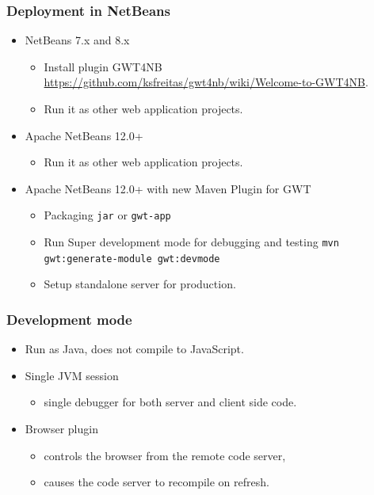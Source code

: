 \documentclass[10pt,table, xcolor=pdflatex]{beamer}
\begin{document}
\begin{frame}[fragile]\frametitle{Deployment in NetBeans}
  \begin{itemize}
    \item NetBeans 7.x and 8.x
      \begin{itemize}
        \item Install plugin GWT4NB \url{https://github.com/ksfreitas/gwt4nb/wiki/Welcome-to-GWT4NB}.
        \item Run it as other web application projects.
      \end{itemize}
    \item Apache NetBeans 12.0+
      \begin{itemize}
        \item Run it as other web application projects.
      \end{itemize}
    \item Apache NetBeans 12.0+ with new Maven Plugin for GWT
      \begin{itemize}
        \item Packaging \texttt{jar} or \texttt{gwt-app}
        \item Run Super development mode for debugging and testing \texttt{mvn gwt:generate-module gwt:devmode}
        \item Setup standalone server for production.
      \end{itemize}
  \end{itemize}
\end{frame}


\begin{frame}\frametitle{Development mode}
	\begin{itemize}
		\item Run as Java, does not compile to JavaScript.
		\item Single JVM session
        \begin{itemize}
        	\item single debugger for both server and client side code.
        \end{itemize}
		\item Browser plugin
        \begin{itemize}
        	\item controls the browser from the remote code server,
            \item causes the code server to recompile on refresh.
        \end{itemize}
	\end{itemize}
\end{frame}
\end{document}
